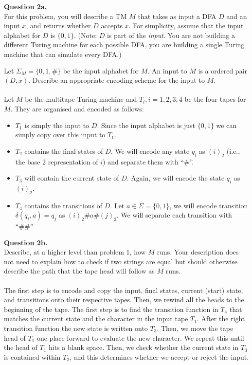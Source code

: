 \documentclass{article}
\newcommand{\set}[1]{\{#1\}}
\newenvironment{question}[2]
{
    {\large \textbf{Question #1.}}\\
    #2\\\\
}{\newpage}
\begin{document}
\begin{question}
    {2a}
    {
        For this problem, you will describe a TM $M$ that takes as input a DFA $D$ and an input $x$, and returns whether $D$ accepts $x$.
        For simplicity, assume that the input alphabet for $D$ is $\{0,1\}$. (Note: $D$ is part of the \textit{input}.
        You are not building a different Turing machine for each possible DFA, you are building a single Turing machine that can simulate every DFA.)

        Let $\Sigma_M = \{0,1,\#\}$ be the input alphabet for $M$. An input to $M$ is a ordered pair $(D,x)$.
        Describe an appropriate encoding scheme for the input to $M$.}

    Let $M$ be the multitape Turing machine and $T_i, i=1,2,3,4$ be the four tapes for $M$. They are organised and encoded as follows:
    \begin{itemize}
        \item $T_1$ is simply the input to $D$. Since the input alphabet is just $\set{0,1}$ we can simply copy over this input to $T_1$.
        \item $T_2$ contains the final states of $D$. We will encode any state $q_i$ as $(i)_2$ (i.e., the base 2 representation of $i$) and separate them with ``\#''.
        \item $T_3$ will contain the current state of $D$. Again, we will encode the state $q_i$ as $(i)_2$.
        \item $T_4$ contains the transitions of $D$. Let $a \in \Sigma = \set{0,1}$, we will encode transition $\delta(q_i, a) = q_j$ as $(i)_2\#a\#(j)_2$. We will separate each transition with ``\#\#''
    \end{itemize}
\end{question}

\begin{question}
    {2b}
    {Describe, at a higher level than problem 1, how $M$ runs.  Your description does not need to explain how to check if two strings are equal
        but should otherwise describe the path that the tape head will follow as $M$ runs.}

    The first step is to encode and copy the input, final states, current (start) state, and transitions onto their respective tapes. Then, we rewind
    all the heads to the beginning of the tape. The first step is to find the transition function in $T_4$ that matches the current state and the character in
    the input tape $T_1$. After the right transition function the new state is written onto $T_3$. Then, we move the tape head of $T_1$ one place forward
    to evaluate the new character. We repeat this until the head of $T_1$ hits a blank space. Then, we check whether the current state in $T_3$ is contained
    within $T_2$, and this determines whether we accept or reject the input.
\end{question}
\end{document}
